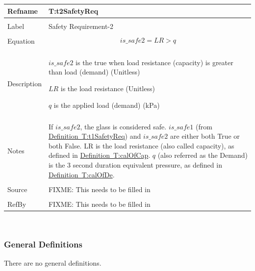 \documentclass[12pt]{article}
\begin{document}
\noindent \begin{minipage}{\textwidth}
\begin{tabular}{p{} p{}}
\toprule \textbf{Refname} & \textbf{T:t2SafetyReq}
\label{T:t2SafetyReq}
\\ \midrule \\
Label & Safety Requirement-2
\\ \midrule \\
Equation & \begin{dmath}
           is\_safe2=LR>q
           \end{dmath}
\\ \midrule \\
Description & \begin{symbDescription}
              \item{$is\_safe2$ is the true when load resistance (capacity) is greater than load (demand) (Unitless)}
              \item{$LR$ is the load resistance (Unitless)}
              \item{$q$ is the applied load (demand) (kPa)}
              \end{symbDescription}
\\ \midrule \\
Notes & If $is\_safe2$, the glass is considered safe. $is\_safe1$ (from \hyperref[T:t1SafetyReq]{Definition~T:t1SafetyReq}) and $is\_safe2$ are either both True or both False. LR is the load resistance (also called capacity), as defined in \hyperref[T:calOfCap]{Definition~T:calOfCap}. $q$ (also referred as the Demand) is the 3 second duration equivalent pressure, as defined in \hyperref[T:calOfDe]{Definition~T:calOfDe}.
\\ \midrule \\
Source & FIXME: This needs to be filled in
\\ \midrule \\
RefBy & FIXME: This needs to be filled in
\\ \bottomrule \end{tabular}
\end{minipage}\\
\subsubsection{General Definitions}
\label{Sec:GDs}
There are no general definitions.
\end{document}
